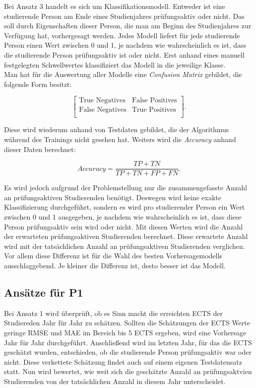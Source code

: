 Bei Ansatz 3 handelt es sich um Klassifikationsmodell. Entweder ist eine studierende Person am Ende eines Studienjahres pr\"ufungsaktiv oder nicht. Das soll
durch Eigenschaften dieser Person, die man am Beginn des Studienjahres zur Verf\"ugung hat, vorhergesagt werden. Jedes Modell liefert f\"ur jede studierende Person
einen Wert zwischen 0 und 1, je nachdem wie wahrscheinlich es ist, dass die studierende Person pr\"ufungsaktiv ist oder nicht. Erst anhand eines manuell festgelegten
Schwellwertes klassifiziert das Modell in die jeweilige Klasse. \\

Man hat f\"ur die Auswertung aller Modelle eine \textit{Confusion Matrix} gebildet, die folgende Form besitzt:

$$ \left[ \begin{array}{rr} \text{True Negatives} & \text{False Positives}  \\  \text{False Negatives} & \text{True Positives} \\  \end{array}\right] .$$

Diese wird wiederum anhand von Testdaten gebildet, die der Algorithmus w\"ahrend des Trainings nicht gesehen hat. Weiters wird die \textit{Accuracy} anhand dieser Daten berechnet:

$$ Accuracy = \frac{TP + TN}{TP + TN + FP + FN}.$$

Es wird jedoch aufgrund der Problemstellung nur die zusammengefasste Anzahl an pr\"ufungsaktiven Studierenden ben\"otigt. Deswegen wird keine exakte Klassifizierung durchgef\"uhrt,
sondern es wird pro studierender Person ein Wert zwischen 0 und 1 ausgegeben, je nachdem wie wahrscheinlich es ist, dass diese Person pr\"ufungsaktiv sein wird oder nicht.
Mit diesen Werten wird die Anzahl der erwarteten pr\"ufungsaktiven Studierenden berechnet.
Diese erwartete Anzahl wird mit der tats\"achlichen Anzahl an pr\"ufungsaktiven Studierenden verglichen.
Vor allem diese Differenz ist f\"ur die Wahl des besten Vorhersagemodells ausschlaggebend. Je kleiner die Differenz ist, desto besser ist das Modell.



\subsection{Ans\"atze f\"ur P1}
Bei Ansatz 1 wird \"uberpr\"uft, ob es Sinn macht die erreichten ECTS der Studiereden Jahr f\"ur Jahr zu sch\"atzen. Sollten die Sch\"atzungen der
ECTS Werte geringe RMSE und MAE im Bereich bis 5 ECTS ergeben, wird eine Vorhersage Jahr f\"ur Jahr durchgef\"uhrt.
Anschlie{\ss}end wird im letzten Jahr, f\"ur das die ECTS gesch\"atzt wurden, entschieden, ob die studierende Person pr\"ufungsaktiv war oder nicht.
Diese verkettete Sch\"atzung findet auch auf einem eigenen Testdatensatz statt. Nun wird bewertet, wie weit sich die gesch\"atzte Anzahl an pr\"ufungsaktvien
Studierenden von der tats\"achlichen Anzahl in diesem Jahr unterscheidet. \\


